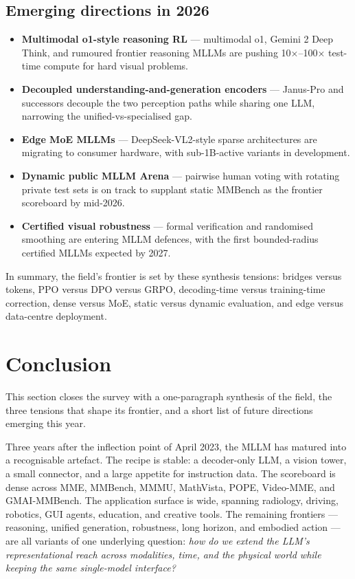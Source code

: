 \documentclass{article}
\begin{document}
\subsection{Emerging directions in 2026}\label{emerging-directions-in-2026}

\begin{itemize}

\item
  \textbf{Multimodal o1-style reasoning RL} --- multimodal o1, Gemini 2 Deep Think, and rumoured frontier reasoning MLLMs are pushing 10×--100× test-time compute for hard visual problems.
\item
  \textbf{Decoupled understanding-and-generation encoders} --- Janus-Pro and successors decouple the two perception paths while sharing one LLM, narrowing the unified-vs-specialised gap.
\item
  \textbf{Edge MoE MLLMs} --- DeepSeek-VL2-style sparse architectures are migrating to consumer hardware, with sub-1B-active variants in development.
\item
  \textbf{Dynamic public MLLM Arena} --- pairwise human voting with rotating private test sets is on track to supplant static MMBench as the frontier scoreboard by mid-2026.
\item
  \textbf{Certified visual robustness} --- formal verification and randomised smoothing are entering MLLM defences, with the first bounded-radius certified MLLMs expected by 2027.
\end{itemize}

In summary, the field's frontier is set by these synthesis tensions: bridges versus tokens, PPO versus DPO versus GRPO, decoding-time versus training-time correction, dense versus MoE, static versus dynamic evaluation, and edge versus data-centre deployment.

\section{Conclusion}\label{conclusion}

This section closes the survey with a one-paragraph synthesis of the field, the three tensions that shape its frontier, and a short list of future directions emerging this year.

Three years after the inflection point of April 2023, the MLLM has matured into a recognisable artefact. The recipe is stable: a decoder-only LLM, a vision tower, a small connector, and a large appetite for instruction data. The scoreboard is dense across MME, MMBench, MMMU, MathVista, POPE, Video-MME, and GMAI-MMBench. The application surface is wide, spanning radiology, driving, robotics, GUI agents, education, and creative tools. The remaining frontiers --- reasoning, unified generation, robustness, long horizon, and embodied action --- are all variants of one underlying question: \emph{how do we extend the LLM's representational reach across modalities, time, and the physical world while keeping the same single-model interface?}
\end{document}
